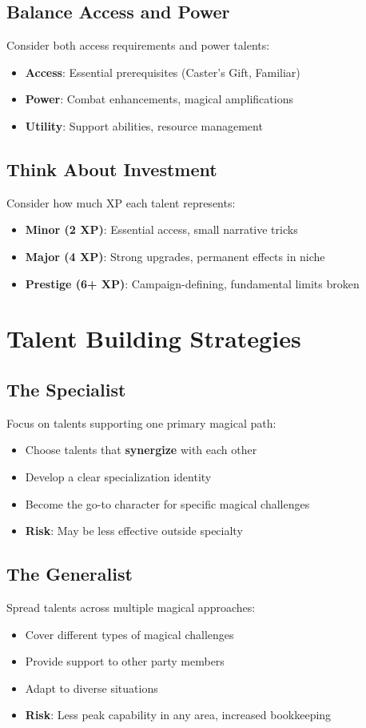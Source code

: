 \subsection*{Balance Access and Power}
Consider both access requirements and power talents:
\begin{itemize}
\item \textbf{Access}: Essential prerequisites (Caster's Gift, Familiar)
\item \textbf{Power}: Combat enhancements, magical amplifications
\item \textbf{Utility}: Support abilities, resource management
\end{itemize}

\subsection*{Think About Investment}
Consider how much XP each talent represents:
\begin{itemize}
\item \textbf{Minor (2 XP)}: Essential access, small narrative tricks
\item \textbf{Major (4 XP)}: Strong upgrades, permanent effects in niche
\item \textbf{Prestige (6+ XP)}: Campaign-defining, fundamental limits broken
\end{itemize}

\section{Talent Building Strategies}

\subsection*{The Specialist}
Focus on talents supporting one primary magical path:
\begin{itemize}
\item Choose talents that \textbf{synergize} with each other
\item Develop a clear specialization identity
\item Become the go-to character for specific magical challenges
\item \textbf{Risk}: May be less effective outside specialty
\end{itemize}

\subsection*{The Generalist}
Spread talents across multiple magical approaches:
\begin{itemize}
\item Cover different types of magical challenges
\item Provide support to other party members
\item Adapt to diverse situations
\item \textbf{Risk}: Less peak capability in any area, increased bookkeeping
\end{itemize}


